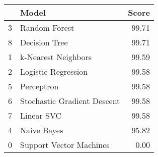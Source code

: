 \begin{tabular}{llr}
\toprule
{} &                        Model &  Score \\
\midrule
3 &                Random Forest &  99.71 \\
8 &                Decision Tree &  99.71 \\
1 &          k-Nearest Neighbors &  99.59 \\
2 &          Logistic Regression &  99.58 \\
5 &                   Perceptron &  99.58 \\
6 &  Stochastic Gradient Descent &  99.58 \\
7 &                   Linear SVC &  99.58 \\
4 &                  Naive Bayes &  95.82 \\
0 &      Support Vector Machines &   0.00 \\
\bottomrule
\end{tabular}

